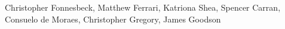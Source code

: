 Christopher Fonnesbeck, Matthew Ferrari, Katriona Shea, Spencer Carran, Consuelo de Moraes, Christopher Gregory, James Goodson